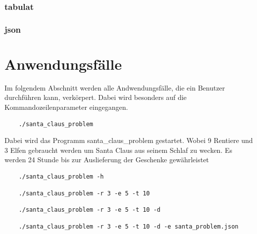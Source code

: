 \documentclass[a4paper,12pt]{exam}
\begin{document}
\subsubsection{tabulat}
\subsubsection{json}


\section{Anwendungsfälle}
Im folgendem Abschnitt werden alle Andwendungsfälle, die ein Benutzer durchführen kann, verkörpert. Dabei wird besonders auf
die Kommandozeilenparameter eingegangen.
\\
\begin{verbatim}
    ./santa_claus_problem
\end{verbatim}
Dabei wird das Programm santa\_claus\_problem gestartet. Wobei 9 Rentiere und 3 Elfen
gebraucht werden um Santa Claus aus seinem Schlaf zu wecken. Es werden 24 Stunde bis zur Auslieferung der Geschenke gewährleistet
\\
\begin{verbatim}
    ./santa_claus_problem -h
\end{verbatim}

\begin{verbatim}
    ./santa_claus_problem -r 3 -e 5 -t 10
\end{verbatim}

\begin{verbatim}
    ./santa_claus_problem -r 3 -e 5 -t 10 -d
\end{verbatim}

\begin{verbatim}
    ./santa_claus_problem -r 3 -e 5 -t 10 -d -e santa_problem.json
\end{verbatim}
\end{document}

